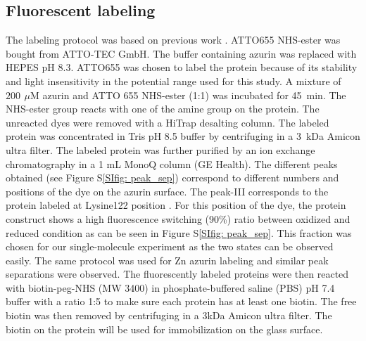 \documentclass[journal=jacsat,manuscript=article]{achemso}
\newcommand{\uM}{\ensuremath{\,\mu\textrm{M}}}
\begin{document}
\subsection{Fluorescent labeling}
The labeling protocol was based on previous work \cite{nicolardi2012topdown}. ATTO655 NHS-ester was bought from 
ATTO-TEC GmbH. The buffer containing azurin was replaced with HEPES pH 8.3. ATTO655 was chosen to label the protein 
because of its stability and light insensitivity in the potential range used for this study. A mixture of $200~\uM$ 
azurin and ATTO 655 NHS-ester (1:1) was incubated for 45~min. The NHS-ester group reacts with one of the amine group 
on the protein. The unreacted dyes were removed with a HiTrap desalting column. The labeled protein was concentrated 
in Tris pH 8.5 buffer by centrifuging in a 3~kDa Amicon ultra filter. The labeled protein was further purified by an 
ion exchange chromatography in a 1 mL MonoQ column (GE Health). The different peaks obtained 
(see Figure S\ref{SIfig: peak_sep}) correspond to different numbers and positions of the dye on the azurin surface. 
The peak-III corresponds to the protein labeled at Lysine122 position \cite{nicolardi2012topdown}. For this position 
of the dye, the protein construct shows a high fluorescence switching (90\%) ratio between oxidized and reduced 
condition as can be seen in Figure S\ref{SIfig: peak_sep}. This fraction was chosen for our single-molecule experiment 
as the two states can be observed easily. The same protocol was used for Zn azurin labeling and similar peak 
separations were observed. The fluorescently labeled proteins were then reacted with biotin-peg-NHS (MW 3400) in 
phosphate-buffered saline (PBS) pH 7.4 buffer with a ratio 1:5 to make sure each protein has at least one biotin. 
The free biotin was then removed by centrifuging in a 3kDa Amicon ultra filter. The biotin on the protein will be 
used for immobilization on the glass surface.
\end{document}
